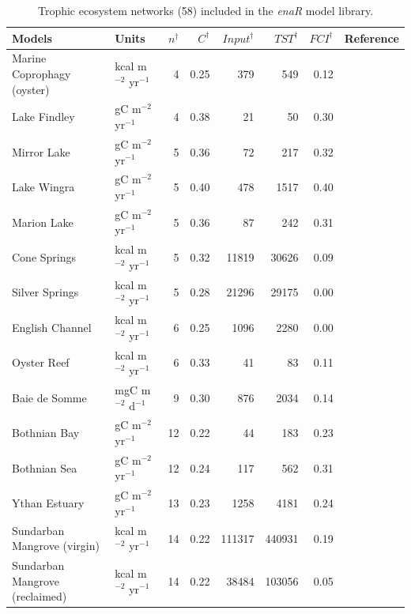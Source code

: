 \documentclass[11pt]{article}
\begin{document}
\begin{table}[ht]
\begin{center}
  \caption{Trophic ecosystem networks (58) included in the
    \textit{enaR} model library.} \label{tab:TRO}
  \begin{tiny}
    \begin{tabular}{llrrrrrr}
      \hline
      Models & Units & $n^\dagger$ & $C^\dagger$ & $Input^\dagger$ & $TST^\dagger$ & $FCI^\dagger$ & Reference \\ 
      \hline
      Marine Coprophagy (oyster) & kcal m$^{-2}$ yr$^{-1}$  &   4 & 0.25 & 379 & 549 & 0.12 & \citet{haven66} \\ 
      Lake Findley  & gC m$^{-2}$ yr$^{-1}$  &   4 & 0.38 &  21 &  50 & 0.30 &  \citet{richey78} \\ 
      Mirror Lake & gC m$^{-2}$ yr$^{-1}$  &   5 & 0.36 &  72 & 217 & 0.32 &   \citet{richey78} \\ 
      Lake Wingra & gC m$^{-2}$ yr$^{-1}$  &   5 & 0.40 & 478 & 1517 & 0.40 &  \citet{richey78} \\ 
      Marion Lake & gC m$^{-2}$ yr$^{-1}$  &   5 & 0.36 &  87 & 242 & 0.31 &  \citet{richey78} \\ 
      Cone Springs & kcal m$^{-2}$ yr$^{-1}$  &   5 & 0.32 & 11819 & 30626 & 0.09 &  \citet{tilly68} \\ 
      Silver Springs & kcal m$^{-2}$ yr$^{-1}$  &   5 & 0.28 & 21296 & 29175 & 0.00 &  \citet{odum57} \\ 
      English Channel & kcal m$^{-2}$ yr$^{-1}$  &   6 & 0.25 & 1096 & 2280 & 0.00 &  \citet{brylinsky72} \\ 
      Oyster Reef  & kcal m$^{-2}$ yr$^{-1}$  &   6 & 0.33 &  41 &  83 & 0.11 &  \citet{dame81} \\ 
      Baie de Somme & mgC m$^{-2}$ d$^{-1}$  &   9 & 0.30 & 876 & 2034 & 0.14 &  \citet{rybarczyk03} \\ 
      Bothnian Bay & gC m$^{-2}$ yr$^{-1}$  &  12 & 0.22 &  44 & 183 & 0.23 &   \citet{sandberg00} \\ 
      Bothnian Sea & gC m$^{-2}$ yr$^{-1}$  &  12 & 0.24 & 117 & 562 & 0.31 &   \citet{sandberg00} \\ 
      Ythan Estuary & gC m$^{-2}$ yr$^{-1}$  &  13 & 0.23 & 1258 & 4181 & 0.24 &  \citet{baird81} \\ 
      Sundarban Mangrove (virgin) & kcal m$^{-2}$ yr$^{-1}$  &  14 & 0.22 & 111317 & 440931 & 0.19 & \citet{ray08} \\ 
      Sundarban Mangrove (reclaimed) & kcal m$^{-2}$ yr$^{-1}$  &  14 & 0.22 & 38484 & 103056 & 0.05 & \citet{ray08} \\ 

\end{tabular}
\end{tiny}
\end{center}
\end{table}
\end{document}
